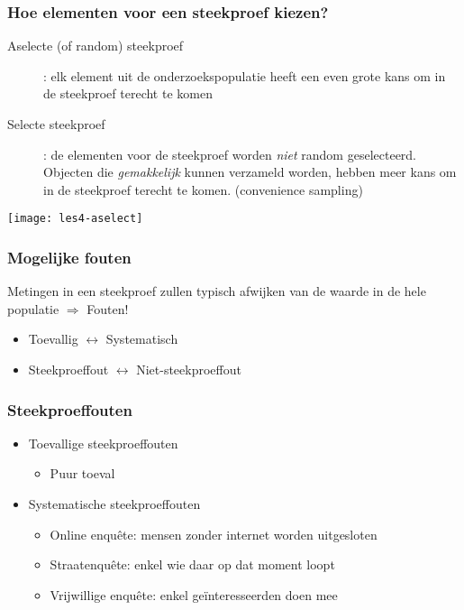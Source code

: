 \documentclass[aspectratio=169]{beamer}
\begin{document}
\begin{frame}
  \frametitle{Hoe elementen voor een steekproef kiezen?}
  
  \begin{description}
    \item[Aselecte (of random) steekproef]: elk element uit de onderzoekspopulatie heeft een even grote kans om in de steekproef terecht te komen
    \item[Selecte steekproef]: de elementen voor de steekproef worden \textit{niet} random geselecteerd.
    Objecten die \textit{gemakkelijk} kunnen verzameld worden, hebben meer kans om in de steekproef terecht te komen.
    (convenience sampling)
  \end{description}
  
  \begin{center}
    \texttt{[image: les4-aselect]}
  \end{center}
\end{frame}

\begin{frame}
  \frametitle{Mogelijke fouten}
  
  Metingen in een steekproef zullen typisch afwijken van de waarde in de hele populatie $\Rightarrow$ Fouten!
  
  \bigskip
  
  \begin{itemize}
    \item Toevallig $\leftrightarrow$ Systematisch
    \item Steekproeffout $\leftrightarrow$ Niet-steekproeffout
  \end{itemize}
\end{frame}

\begin{frame}
  \frametitle{Steekproeffouten}
  
  \begin{itemize}
    \item<+-> Toevallige steekproeffouten
    \begin{itemize}
      \item Puur toeval
    \end{itemize}
    \item<+-> Systematische steekproeffouten
    \begin{itemize}
      \item Online enquête: mensen zonder internet worden uitgesloten
      \item Straatenquête: enkel wie daar op dat moment loopt
      \item Vrijwillige enquête: enkel geïnteresseerden doen mee
    \end{itemize}
  \end{itemize}
\end{frame}
\end{document}
